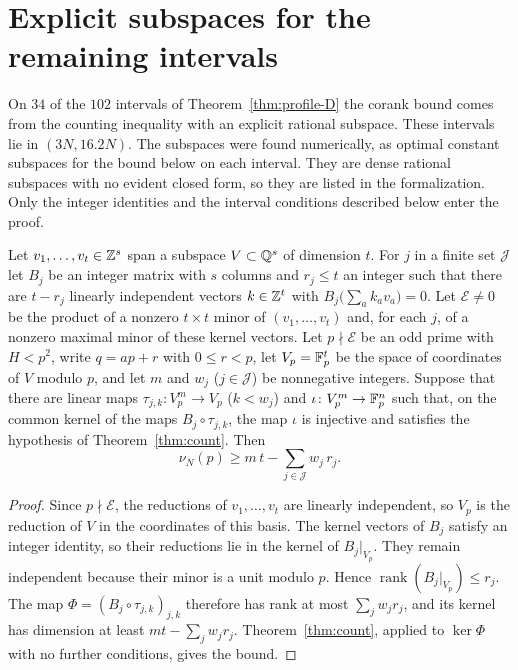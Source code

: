 \section{Explicit subspaces for the remaining intervals}\label{app:windows}

On $34$ of the $102$ intervals of Theorem~\ref{thm:profile-D} the corank bound comes from the counting
inequality with an explicit rational subspace. These intervals lie in $(3N,16.2N)$. The subspaces were found
numerically, as optimal constant subspaces for the bound below on each interval. They are dense rational
subspaces with no evident closed form, so they are listed in the formalization. Only the integer identities
and the interval conditions described below enter the proof.

\begin{theorem}\label{thm:profile}
Let $v_1,\dots,v_t\in\mathbb Z^s$ span a subspace $V\subset\mathbb Q^s$ of dimension $t$. For $j$ in a finite set $\mathcal J$
let $B_j$ be an integer matrix with $s$ columns and $r_j\le t$ an integer such that there are $t-r_j$ linearly
independent vectors $k\in\mathbb Z^t$ with $B_j\bigl(\sum_ak_av_a\bigr)=0$. Let $\mathcal E\ne0$ be the product of a
nonzero $t\times t$ minor of $(v_1,\dots,v_t)$ and, for each $j$, of a nonzero maximal minor of these kernel
vectors. Let $p\nmid\mathcal E$ be an odd prime with $H<p^2$, write $q=ap+r$ with $0\le r<p$, let $V_p=\mathbb F_p^t$ be
the space of coordinates of $V$ modulo $p$, and let $m$ and $w_j$ ($j\in\mathcal J$) be nonnegative integers.
Suppose that there are linear maps $\tau_{j,k}\colon V_p^m\to V_p$ ($k<w_j$) and $\iota\colon V_p^m\to\mathbb F_p^n$ such
that, on the common kernel of the maps $B_j\circ\tau_{j,k}$, the map $\iota$ is injective and satisfies the
hypothesis of Theorem~\ref{thm:count}. Then
\[
 \nu_N(p)\ge m\,t-\sum_{j\in\mathcal J}w_j\,r_j .
\]
\end{theorem}

\begin{proof}
Since $p\nmid\mathcal E$, the reductions of $v_1,\dots,v_t$ are linearly independent, so $V_p$ is the
reduction of $V$ in the coordinates of this basis. The kernel vectors of $B_j$ satisfy an integer identity,
so their reductions lie in the kernel of $B_j|_{V_p}$. They remain independent because their minor is a unit
modulo $p$. Hence $\operatorname{rank}(B_j|_{V_p})\le r_j$. The map $\Phi=(B_j\circ\tau_{j,k})_{j,k}$ therefore
has rank at most $\sum_jw_jr_j$, and its kernel has dimension at least $mt-\sum_jw_jr_j$.
Theorem~\ref{thm:count}, applied to $\ker\Phi$ with no further conditions, gives the bound.
\end{proof}

